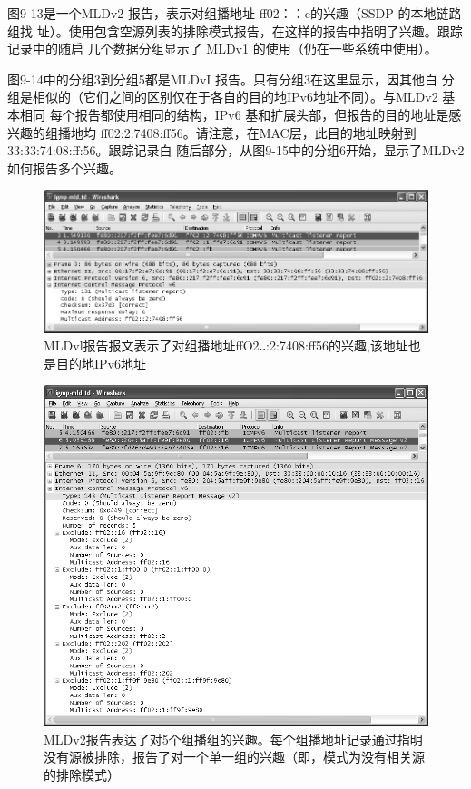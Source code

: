 图9-13是一个MLDv2 报告，表示对组播地址 ff02：：c的兴趣（SSDP 的本地链路组找
址）。使用包含空源列表的排除模式报告，在这样的报告中指明了兴趣。跟踪记录中的随启
几个数据分组显示了 MLDv1 的使用（仍在一些系统中使用）。

图9-14中的分组3到分组5都是MLDvI 报告。只有分组3在这里显示，因其他白
分组是相似的（它们之间的区别仅在于各自的目的地IPv6地址不同）。与MLDv2 基本相同
每个报告都使用相同的结构，IPv6 基和扩展头部，但报告的目的地址是感兴趣的组播地均
ff02:2:7408:ff56。请注意，在MAC层，此目的地址映射到 33:33:74:08:ff:56。跟踪记录白
随后部分，从图9-15中的分组6开始，显示了MLDv2如何报告多个兴趣。
\begin{figure}[ht]
  \centering
  \includegraphics[width=1.0\textwidth]{imgs/9/9-14.png}
  \caption{MLDvl报告报文表示了对组播地址ffO2‥:2:7408:ff56的兴趣,该地址也是目的地IPv6地址}
\end{figure}

\begin{figure}[ht]
  \centering
  \includegraphics[width=1.0\textwidth]{imgs/9/9-15.png}
  \caption{MLDv2报告表达了对5个组播组的兴趣。每个组播地址记录通过指明没有源被排除，报告了对一个单一组的兴趣（即，模式为没有相关源的排除模式）}
\end{figure}


